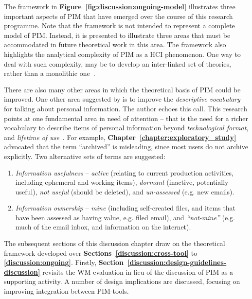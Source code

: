 The framework in \textbf{Figure~\ref{fig:discussion:ongoing-model}} illustrates three important aspects of PIM that have emerged over the course of this research programme.  Note that the framework is not intended to represent a complete model of PIM.  Instead, it is presented to illustrate three areas that must be accommodated in future theoretical work in this area.  The framework also highlights the analytical complexity of PIM as a HCI phenomenon.  One way to deal with such complexity, may be to develop an inter-linked set of theories, rather than a monolithic one~\citep{barnard:00}.

There are also many other areas in which the theoretical basis of PIM could be improved.  One other area suggested by \citet{Whittaker-rta:00} is to improve the \textit{descriptive vocabulary} for talking about personal information.  The author echoes this call.  This research points at one fundamental area in need of attention -- that is the need for a richer vocabulary to describe items of personal information beyond \textit{technological format}, and \textit{lifetime of use}~\citep{bn:95}. For example, \textbf{Chapter~\ref{chapter:exploratory_study}} advocated that the term ``archived'' is misleading, since most users do not archive explicitly.  Two alternative sets of terms are suggested:
\begin{enumerate}
	\item \textit{Information usefulness} -- \textit{active} (relating to current production activities, including ephemeral and working items), \textit{dormant} (inactive, potentially useful), \textit{not useful} (should be deleted), and \textit{un-assessed} (e.g. new emails).
	\item \textit{Information ownership} -- \textit{mine} (including self-created files, and items that have been assessed as having value, e.g. filed email), and \textit{``not-mine''} (e.g. much of the email inbox, and information on the internet).
\end{enumerate}

The subsequent sections of this discussion chapter draw on the theoretical framework developed over \textbf{Sections~\ref{discussion:cross-tool}} to \textbf{\ref{discussion:ongoing}}. Firstly, \textbf{Section~\ref{discussion:design-guidelines-discussion}} revisits the WM evaluation in lieu of the discussion of PIM as a supporting activity.  A number of design implications are discussed, focusing on improving integration between PIM-tools.  %

